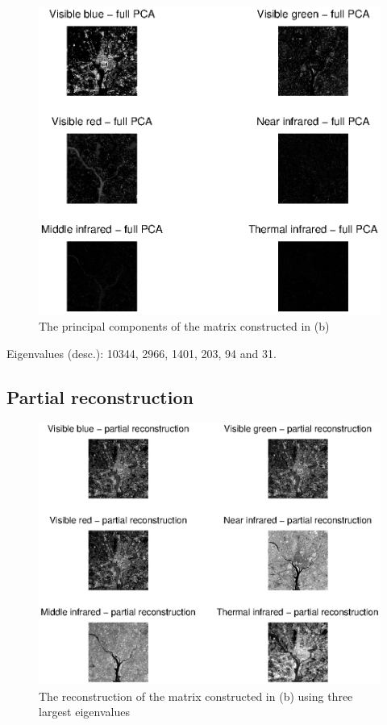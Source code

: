 \begin{figure}[htb]
 \centering
 \includegraphics[width=\linewidth]{full_pca.eps}
 \caption{The principal components of the matrix constructed in (b)}
 \label{fig:full_pca}
\end{figure}
Eigenvalues (desc.): 10344, 2966, 1401, 203, 94 and 31.
\clearpage

\subsection{Partial reconstruction}

\begin{figure}[htb]
 \centering
 \includegraphics[width=\linewidth]{partial_recon_pca.eps}
 \caption{The reconstruction of the matrix constructed in (b) using three largest eigenvalues}
 \label{fig:partial_recon_pca}
\end{figure}

